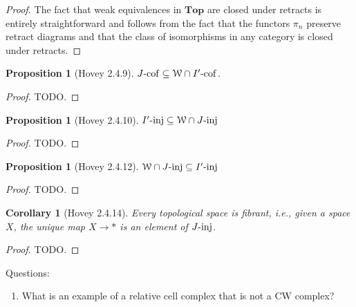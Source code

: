 \documentclass{amsart}
\theoremstyle{plain}
\newtheorem{corollary}[theorem]{Corollary}
\newtheorem{proposition}[theorem]{Proposition}
\theoremstyle{definition}
\newcommand{\Top}{\mbf{Top}}
\newcommand{\sseq}{\subseteq}
\newcommand{\0}{\mathbf{0}}
\newcommand{\cW}{\mathcal W}
\newcommand{\mbf}[1]{\mathbf{#1}}
\renewcommand{\(}{\left(}
\renewcommand{\)}{\right)}
\newcommand{\inj}{\text-\mathrm{inj}}
\newcommand{\cof}{\text-\mathrm{cof}}
\begin{document}
\begin{proof}
  The fact that weak equivalences in $\Top$ are closed under retracts is entirely straightforward and follows from the fact that the functors $\pi_n$ preserve retract diagrams and that the class of isomorphisms in any category is closed under retracts.
\end{proof}

\begin{proposition}[Hovey 2.4.9]\label{2.4.9}
  $J\cof\sseq\cW\cap I'\cof$.
\end{proposition}
\begin{proof}
  \color{red}TODO.
\end{proof}

\begin{proposition}[Hovey 2.4.10]\label{2.4.10}
  $I'\inj\sseq\cW\cap J\inj$
\end{proposition}
\begin{proof}
  \color{red}TODO.
\end{proof}

\begin{proposition}[Hovey 2.4.12]\label{2.4.12}
  $\cW\cap J\inj\sseq I'\inj$
\end{proposition}
\begin{proof}
  \color{red}TODO.
\end{proof}

\begin{corollary}[Hovey 2.4.14]\label{2.4.14}
  Every topological space is fibrant, i.e., given a space $X$, the unique map $X\to\ast$ is an element of $J\inj$.
\end{corollary}
\begin{proof}
  \color{red}TODO.
\end{proof}

\pagebreak

Questions:\begin{enumerate}
  \item What is an example of a relative cell complex that is not a CW complex?
\end{enumerate}
\end{document}
